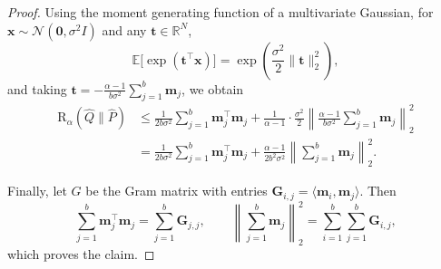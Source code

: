 \documentclass{article}
\theoremstyle{plain}
\theoremstyle{definition}
\theoremstyle{remark}
\begin{document}
\begin{proof}
Using the moment generating function of a multivariate Gaussian, for $\mathbf{x}\sim \mathcal{N}(\mathbf{0}, \sigma^2 I)$ and any $\mathbf{t}\in\mathbb{R}^N$,
\[
\mathbb{E}\big[\exp(\mathbf{t}^\top \mathbf{x})\big]
=
\exp\!\left(\frac{\sigma^2}{2}\|\mathbf{t}\|_2^2\right),
\]
and taking $\mathbf{t} = -\frac{\alpha - 1}{b\sigma^2}\sum_{j=1}^{b}\mathbf{m}_j$, we obtain
\begin{align}
    \mathrm{R}_{\alpha}(\hat{Q}\|\hat{P})
    &\le
    \frac{1}{2b\sigma^2}\sum_{j = 1}^{b} \mathbf{m}_j^\top \mathbf{m}_j
    +
    \frac{1}{\alpha - 1}
    \cdot
    \frac{\sigma^2}{2}
    \left\|
    \frac{\alpha - 1}{b\sigma^2}
    \sum_{j = 1}^{b}\mathbf{m}_j
    \right\|_2^2
    \\
    &=
    \frac{1}{2b\sigma^2}\sum_{j = 1}^{b} \mathbf{m}_j^\top \mathbf{m}_j
    +
    \frac{\alpha - 1}{2b^2\sigma^2}
    \left\|
    \sum_{j = 1}^{b}\mathbf{m}_j
    \right\|_2^2.
\end{align}

Finally, let $G$ be the Gram matrix with entries $\mathbf{G}_{i,j} = \langle \mathbf{m}_i, \mathbf{m}_j\rangle$. Then
\[
\sum_{j=1}^{b}\mathbf{m}_j^\top\mathbf{m}_j = \sum_{j=1}^{b} \mathbf{G}_{j,j},
\qquad
\left\|\sum_{j=1}^{b}\mathbf{m}_j\right\|_2^2
=
\sum_{i=1}^{b}\sum_{j=1}^{b} \mathbf{G}_{i,j},
\]
which proves the claim.
\end{proof}

\clearpage



%


\end{document}
